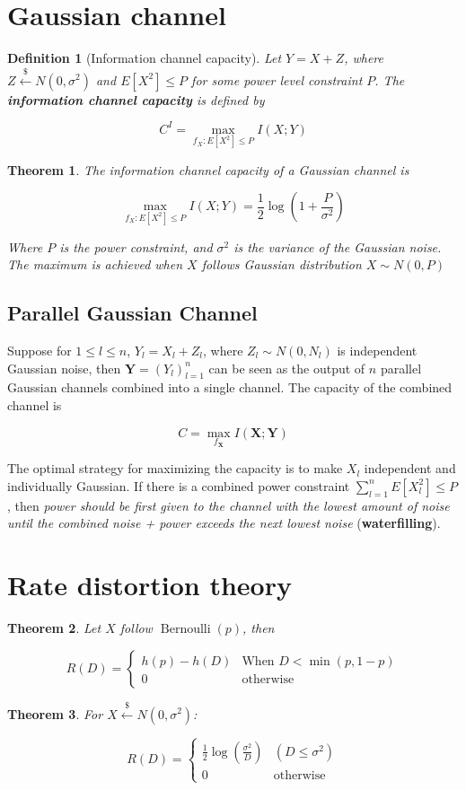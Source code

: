 \documentclass{article}
\newcommand{\leftsample}{\overset{{\scriptscriptstyle\$}}{\leftarrow}}
\newtheorem{definition}{Definition}[section]
\newtheorem{theorem}{Theorem}[section]
\begin{document}
\section{Gaussian channel}
\begin{definition}[Information channel capacity]
    Let $Y = X + Z$, where $Z \leftsample N(0, \sigma^2)$ and $E[X^2] \leq P$ for some power level constraint $P$. The \textbf{information channel capacity} is defined by

    $$
    C^I = \max_{f_X : E[X^2] \leq P} I(X; Y)
    $$
\end{definition}

\begin{theorem}
    The information channel capacity of a Gaussian channel is

    \begin{equation}
        \max_{f_X: E[X^2] \leq P} I(X; Y) = \frac{1}{2}\log{(1 + \frac{P}{\sigma^2})}
    \end{equation}

    Where $P$ is the power constraint, and $\sigma^2$ is the variance of the Gaussian noise. The maximum is achieved when $X$ follows Gaussian distribution $X \sim N(0, P)$
\end{theorem}

\subsection{Parallel Gaussian Channel}
Suppose for $1 \leq l \leq n$, $Y_l = X_l + Z_l$, where $Z_l \sim N(0, N_l)$ is independent Gaussian noise, then $\mathbf{Y} = (Y_l)_{l=1}^n$ can be seen as the output of $n$ parallel Gaussian channels combined into a single channel. The capacity of the combined channel is

\begin{equation*}
    C = \max_{f_\mathbf{X}}I(\mathbf{X}; \mathbf{Y})
\end{equation*}

The optimal strategy for maximizing the capacity is to make $X_l$ independent and individually Gaussian. If there is a combined power constraint $\sum_{l=1}^nE[X_l^2] \leq P$, then \textit{power should be first given to the channel with the lowest amount of noise until the combined noise + power exceeds the next lowest noise} (\textbf{waterfilling}).

\section{Rate distortion theory}
\begin{theorem}
    Let $X$ follow $\operatorname{Bernoulli}(p)$, then

    $$
    R(D) = \begin{cases}
        h(p) - h(D)  & \text{When $D < \min(p, 1-p)$} \\
        0   &  \text{otherwise}
    \end{cases}
$$
\end{theorem}

\begin{theorem}
    For $X \leftsample N(0, \sigma^2)$:

    $$
    R(D) = \begin{cases}
        \frac{1}{2}\log(\frac{\sigma^2}{D}) & (D \leq \sigma^2) \\
        0 & \text{otherwise}
    \end{cases}
    $$
\end{theorem}
\end{document}
